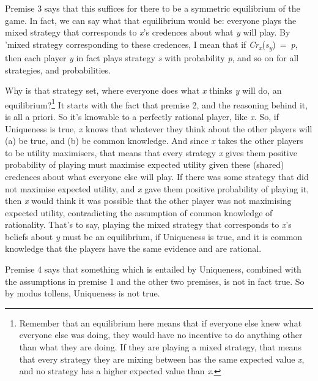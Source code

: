 \documentclass[
  11pt,
  letterpaper,
  DIV=11,
  numbers=noendperiod,
  twoside]{scrartcl}
\begin{document}
Premise 3 says that this suffices for there to be a symmetric
equilibrium of the game. In fact, we can say what that equilibrium would
be: everyone plays the mixed strategy that corresponds to \emph{x}'s
credences about what \emph{y} will play. By 'mixed strategy
corresponding to these credences, I mean that if
\emph{Cr\textsubscript{x}}(\emph{s\textsubscript{y}})~=~\emph{p}, then
each player \emph{y} in fact plays strategy \emph{s} with probability
\emph{p}, and so on for all strategies, and probabilities.

Why is that strategy set, where everyone does what \emph{x} thinks
\emph{y} will do, an equilibrium?\footnote{Remember that an equilibrium
  here means that if everyone else knew what everyone else was doing,
  they would have no incentive to do anything other than what they are
  doing. If they are playing a mixed strategy, that means that every
  strategy they are mixing between has the same expected value \emph{x},
  and no strategy has a higher expected value than \emph{x}.} It starts
with the fact that premise 2, and the reasoning behind it, is all a
priori. So it's knowable to a perfectly rational player, like \emph{x}.
So, if Uniqueness is true, \emph{x} knows that whatever they think about
the other players will (a) be true, and (b) be common knowledge. And
since \emph{x} takes the other players to be utility maximisers, that
means that every strategy \emph{x} gives them positive probability of
playing must maximise expected utility given these (shared) credences
about what everyone else will play. If there was some strategy that did
not maximise expected utility, and \emph{x} gave them positive
probability of playing it, then \emph{x} would think it was possible
that the other player was not maximising expected utility, contradicting
the assumption of common knowledge of rationality. That's to say,
playing the mixed strategy that corresponds to \emph{x}'s beliefs about
\emph{y} must be an equilibrium, if Uniqueness is true, and it is common
knowledge that the players have the same evidence and are rational.

Premise 4 says that something which is entailed by Uniqueness, combined
with the assumptions in premise 1 and the other two premises, is not in
fact true. So by modus tollens, Uniqueness is not true.
\end{document}
